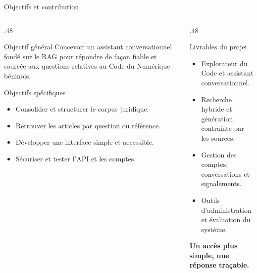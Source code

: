 \documentclass[aspectratio=169,10pt]{beamer}
\begin{document}
\begin{frame}{Objectifs et contribution}
  \begin{columns}[T,onlytextwidth]
    \begin{column}{.48\textwidth}
      \begin{block}{Objectif général}
        Concevoir un assistant conversationnel fondé sur le RAG pour répondre de façon fiable et sourcée aux questions relatives au Code du Numérique béninois.
      \end{block}
      \begin{block}{Objectifs spécifiques}
        \begin{itemize}\setlength\itemsep{0.3em}
          \item Consolider et structurer le corpus juridique.
          \item Retrouver les articles par question ou référence.
          \item Développer une interface simple et accessible.
          \item Sécuriser et tester l'API et les comptes.
        \end{itemize}
      \end{block}
    \end{column}
    \begin{column}{.48\textwidth}
      \begin{block}{Livrables du projet}
        \begin{itemize}\setlength\itemsep{0.4em}
          \item Explorateur du Code et assistant conversationnel.
          \item Recherche hybride et génération contrainte par les sources.
          \item Gestion des comptes, conversations et signalements.
          \item Outils d'administration et évaluation du système.
        \end{itemize}
      \end{block}
      \centering\large\color{teal}\textbf{Un accès plus simple, une réponse traçable.}
    \end{column}
  \end{columns}
\end{frame}
\end{document}
